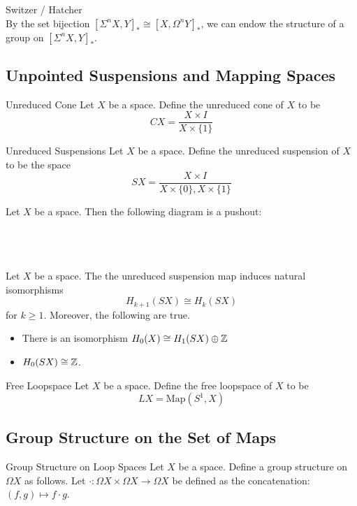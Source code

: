 \documentclass[a4paper]{article}
\begin{document}
Switzer / Hatcher\\

By the set bijection $[\Sigma^nX,Y]_\ast\cong[X,\Omega^nY]_\ast$, we can endow the structure of a group on $[\Sigma^nX,Y]_\ast$. 

\subsection{Unpointed Suspensions and Mapping Spaces}
\begin{defn}{Unreduced Cone}{} Let $X$ be a space. Define the unreduced cone of $X$ to be $$CX=\frac{X\times I}{X\times\{1\}}$$
\end{defn}

\begin{defn}{Unreduced Suspensions}{} Let $X$ be a space. Define the unreduced suspension of $X$ to be the space $$SX=\frac{X\times I}{X\times\{0\},X\times\{1\}}$$
\end{defn}

\begin{prp}{}{} Let $X$ be a space. Then the following diagram is a pushout: \\~\\
\\~\\
\end{prp}

\begin{prp}{}{} Let $X$ be a space. The the unreduced suspension map induces natural isomorphisms $$H_{k+1}(SX)\cong H_k(SX)$$ for $k\geq 1$. Moreover, the following are true. 
\begin{itemize}
\item There is an isomorphism $H_0(X)\cong H_1(SX)\oplus\mathbb{Z}$
\item $H_0(SX)\cong\mathbb{Z}$. 
\end{itemize}
\end{prp}

\begin{defn}{Free Loopspace}{} Let $X$ be a space. Define the free loopspace of $X$ to be $$LX=\text{Map}(S^1,X)$$
\end{defn}

\subsection{Group Structure on the Set of Maps}
\begin{defn}{Group Structure on Loop Spaces}{} Let $X$ be a space. Define a group structure on $\Omega X$ as follows. Let $\cdot:\Omega X\times\Omega X\to\Omega X$ be defined as the concatenation: $(f,g)\mapsto f\cdot g$. 
\end{defn}
\end{document}
